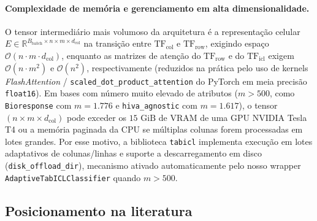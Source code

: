 \documentclass[11pt,a4paper]{article}
\begin{document}
\paragraph{Complexidade de memória e gerenciamento em alta dimensionalidade.}
O tensor intermediário mais volumoso da arquitetura é a representação celular $E \in \mathbb{R}^{B_{\mathrm{batch}} \times n \times m \times d_{\mathrm{col}}}$ na transição entre $\mathrm{TF}_{\mathrm{col}}$ e $\mathrm{TF}_{\mathrm{row}}$, exigindo espaço $\mathcal{O}(n \cdot m \cdot d_{\mathrm{col}})$, enquanto as matrizes de atenção do $\mathrm{TF}_{\mathrm{row}}$ e do $\mathrm{TF}_{\mathrm{icl}}$ exigem $\mathcal{O}(n \cdot m^2)$ e $\mathcal{O}(n^2)$, respectivamente (reduzidos na prática pelo uso de kernels \emph{FlashAttention} / \texttt{scaled\_dot\_product\_attention} do PyTorch em meia precisão \texttt{float16}). Em bases com número muito elevado de atributos ($m > 500$, como \texttt{Bioresponse} com $m = 1.776$ e \texttt{hiva\_agnostic} com $m = 1.617$), o tensor $(n \times m \times d_{\mathrm{col}})$ pode exceder os $15\text{ GiB}$ de VRAM de uma GPU NVIDIA Tesla T4 ou a memória paginada da CPU se múltiplas colunas forem processadas em lotes grandes. Por esse motivo, a biblioteca \texttt{tabicl} implementa execução em lotes adaptativos de colunas/linhas e suporte a descarregamento em disco (\texttt{disk\_offload\_dir}), mecanismo ativado automaticamente pelo nosso wrapper \texttt{AdaptiveTabICLClassifier} quando $m > 500$.

\subsection{Posicionamento na literatura}
\label{sec:literatura}
\end{document}
